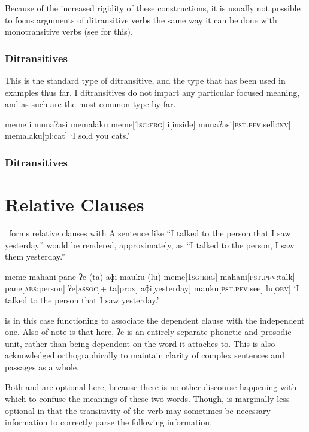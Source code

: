 Because of the increased rigidity of these constructions, it is usually not possible to focus arguments of ditransitive verbs the same way it can be done with monotransitive verbs (see  for this).

\subsubsection{ Ditransitives}

This is the standard type of ditransitive, and the type that has been used in examples thus far. I ditransitives do not impart any particular focused meaning, and as such are the most common type by far.

\ex
\begingl
\glpreamble meme i munaʔasi memalaku
\endpreamble
meme[\textsc{1sg:erg}]
i[inside]
munaʔasi[\textsc{pst.pfv:}sell\textsc{:inv}]
memalaku[pl:cat]
\glft `I sold you cats.'
\endgl
\xe


\subsubsection{ Ditransitives}

\section{Relative Clauses}

\langname\ forms relative clauses with  A sentence like ``I talked to the person that I saw yesterday.'' would be rendered, approximately, as ``I talked to the person, I saw them yesterday.''

\ex
\begingl
\glpreamble meme mahani pane ʔe (ta) aɸi mauku (lu)
\endpreamble
meme[\textsc{1sg:erg}]
mahani[\textsc{pst.pfv:}talk]
pane[\textsc{abs:}person]
ʔe[\textsc{assoc}]+
\nogloss{\lbrack}
ta[prox]
aɸi[yesterday]
mauku[\textsc{pst.pfv:}see]
lu[\textsc{obv}]
\nogloss{\rbrack}
\glft `I talked to the person that I saw yesterday.'
\endgl
\xe

 is in this case functioning to associate the dependent clause with the independent one. Also of note is that here, ʔe is an entirely separate phonetic and prosodic unit, rather than being dependent on the word it attaches to. This is also acknowledged orthographically to maintain clarity of complex sentences and passages as a whole.

Both  and  are optional here, because there is no other discourse happening with which to confuse the meanings of these two words. Though,  is marginally less optional in that the transitivity of the verb may sometimes be necessary information to correctly parse the following information.

